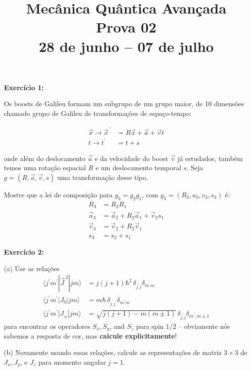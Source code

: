 \documentclass[12pt]{article}
\title{Mecânica Quântica Avançada\\%
Prova 02\\%
28 de junho -- 07 de julho}
\date{}
\begin{document}
\maketitle
\vspace*{-4em}

\textbf{Exercício 1:} 

Os boosts de Galileu formam um subgrupo de um grupo maior,
de 10 dimensões chamado grupo de Galileu de transformações de espaço-tempo:

\[
\begin{aligned}
\vec{x} \rightarrow \vec{x}^{\,\prime}&=R \vec{x}+\vec{a}+\vec{v} t \\ 
t \rightarrow t^{\prime}&=t+s
\end{aligned}
\]

onde além do deslocamento \(\vec{a}\) e da velocidade do boost \(\vec{v}\) já estudados, também temos
uma rotação espacial \(R\) e um deslocamento temporal \(s\). Seja \(g=(R, \vec{a}, \vec{v}, s)\) uma transformação desse tipo.

Mostre que a lei de composição para \(g_{3}=g_{2} g_{1}\), com \(g_{3}=\left(R_{3}, a_{3}, v_{3}, s_{3}\right)\) é:
\[
\begin{aligned} 
R_{3} &=R_{2} R_{1} \\ 
\vec{a}_{3} &=\vec{a}_{2}+R_{2} \vec{a}_{1}+\vec{v}_{2} s_{1} \\ 
\vec{v}_{3} &=\vec{v}_{2}+R_{2} \vec{v}_{1} \\ 
s_{3} &=s_{2}+s_{1} 
\end{aligned}
\]


\textbf{Exercício 2:}

(a) Use as relações
\[
\begin{aligned}
\langle j^{\prime} m^{\prime}|\vec{J}^{\,2}| j m\rangle &=j(j+1) \hbar^2 \,\delta_{j^{\prime} j} \delta_{m^{\prime} m} \\
\langle j^{\prime} m^{\prime}|J_{0}| j m\rangle &=m \hbar \, \delta_{j^{\prime} j} \,\delta_{m^{\prime} m} \\
\langle j^{\prime} m^{\prime}|J_{\pm}| j m\rangle &=\sqrt{j(j+1)-m(m\pm1)}\,\delta_{j^{\prime} j} \delta_{m^{\prime}, m \pm 1}
\end{aligned}
\]
para encontrar os operadores $S_{x}, S_{y}$, and $S_{z}$ para spin $1 / 2$ 
-- obviamente nós sabemos a resposta de cor, mas \textbf{calcule explicitamente}!

(b) Novamente usando essas relações, calcule as representações de matriz $3 \times 3$ 
de $J_{x}, J_{y}$, e $J_{z}$ para momento angular $j=1$.
\end{document}
